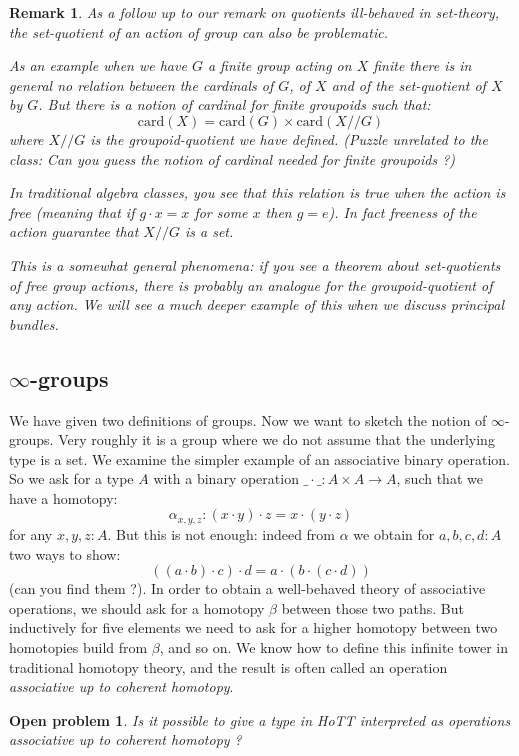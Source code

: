 \documentclass{article}
\newcommand{\sse}[1]{\medbreak \subsection{#1}}
\renewcommand{\r}{\rightarrow}
\newtheorem{remark}{Remark}
\newtheorem{open_problem}{Open problem}
\begin{document}
\begin{remark}
As a follow up to our remark on quotients ill-behaved in set-theory, the set-quotient of an action of group can also be problematic. 

As an example when we have $G$ a finite group acting on $X$ finite there is in general no relation between the cardinals of $G$, of $X$ and of the set-quotient of $X$ by $G$. But there is a notion of cardinal for finite groupoids such that:
\[\mathrm{card}(X) = \mathrm{card}(G) \times \mathrm{card}(X//G)\]
where $X//G$ is the groupoid-quotient we have defined. (Puzzle unrelated to the class: Can you guess the notion of cardinal needed for finite groupoids ?)

In traditional algebra classes, you see that this relation is true when the action is free (meaning that if $g\cdot x =x$ for some $x$ then $g=e$). In fact freeness of the action guarantee that $X//G$ is a set.

This is a somewhat general phenomena: if you see a theorem about set-quotients of free group actions, there is probably an analogue for the groupoid-quotient of any action. We will see a much deeper example of this when we discuss principal bundles. 
\end{remark}


\sse{$\infty$-groups}

We have given two definitions of groups. Now we want to sketch the notion of $\infty$-groups. Very roughly it is a group where we do not assume that the underlying type is a set. We examine the simpler example of an associative binary operation. So we ask for a type $A$ with a binary operation $\_\cdot\_ : A\times A \r A$, such that we have a homotopy:
\[\alpha_{x,y,z} : (x\cdot y) \cdot z = x\cdot (y\cdot z)\] 
for any $x,y,z:A$. But this is not enough: indeed from $\alpha$ we obtain for $a,b,c,d:A$ two ways to show:
\[((a\cdot b)\cdot c )\cdot d = a\cdot(b\cdot (c\cdot d))\]
(can you find them ?). In order to obtain a well-behaved theory of associative operations, we should ask for a homotopy $\beta$ between those two paths. But inductively for five elements we need to ask for a higher homotopy between two homotopies build from $\beta$, and so on. We know how to define this infinite tower in traditional homotopy theory, and the result is often called an operation \emph{associative up to coherent homotopy}.

\begin{open_problem}
Is it possible to give a type in HoTT interpreted as operations associative up to coherent homotopy ?
\end{open_problem}
\end{document}
